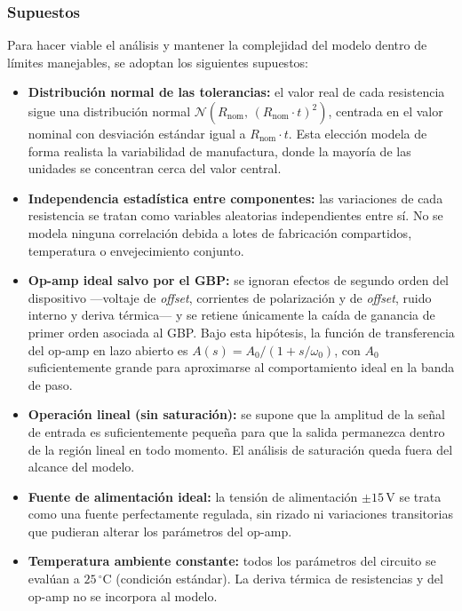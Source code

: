 ﻿\documentclass[12pt, letterpaper]{article}
\begin{document}
\subsubsection*{Supuestos}

Para hacer viable el análisis y mantener la complejidad del modelo dentro de
límites manejables, se adoptan los siguientes supuestos:

\begin{itemize}[leftmargin=2em]
    \item \textbf{Distribución normal de las tolerancias:}
          el valor real de cada resistencia sigue una distribución normal
          \(\mathcal{N}(R_{\text{nom}},\,(R_{\text{nom}}\cdot t)^2)\),
          centrada en el valor nominal con desviación estándar igual a
          \(R_{\text{nom}} \cdot t\). Esta elección modela de forma realista
          la variabilidad de manufactura, donde la mayoría de las unidades se
          concentran cerca del valor central.

    \item \textbf{Independencia estadística entre componentes:}
          las variaciones de cada resistencia se tratan como variables aleatorias
          independientes entre sí. No se modela ninguna correlación debida a
          lotes de fabricación compartidos, temperatura o envejecimiento conjunto.

    \item \textbf{Op-amp ideal salvo por el GBP:}
          se ignoran efectos de segundo orden del dispositivo —voltaje de
          \textit{offset}, corrientes de polarización y de \textit{offset},
          ruido interno y deriva térmica— y se retiene únicamente la caída de
          ganancia de primer orden asociada al GBP\@. Bajo esta hipótesis, la
          función de transferencia del op-amp en lazo abierto es
          \(A(s) = A_0 / (1 + s/\omega_0)\), con \(A_0\) suficientemente
          grande para aproximarse al comportamiento ideal en la banda de paso.

    \item \textbf{Operación lineal (sin saturación):}
          se supone que la amplitud de la señal de entrada es suficientemente
          pequeña para que la salida permanezca dentro de la región lineal en
          todo momento. El análisis de saturación queda fuera del alcance del
          modelo.

    \item \textbf{Fuente de alimentación ideal:}
          la tensión de alimentación \(\pm 15\,\text{V}\) se trata como una
          fuente perfectamente regulada, sin rizado ni variaciones transitorias
          que pudieran alterar los parámetros del op-amp.

    \item \textbf{Temperatura ambiente constante:}
          todos los parámetros del circuito se evalúan a \(25\,^{\circ}\text{C}\)
          (condición estándar). La deriva térmica de resistencias y del op-amp
          no se incorpora al modelo.
\end{itemize}
\end{document}

